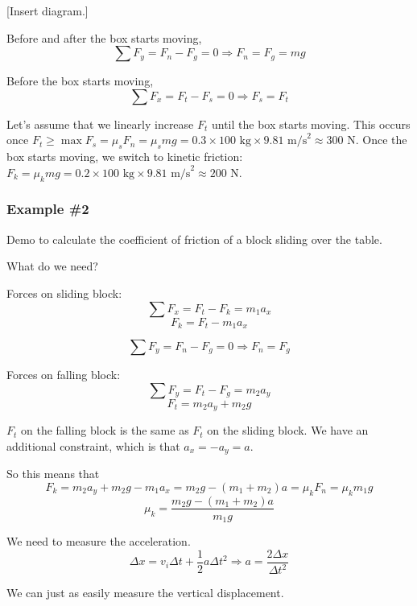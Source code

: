 [Insert diagram.]
\vspace{5cm}

Before and after the box starts moving,
$$\sum F_y = F_n-F_g=0\Rightarrow F_n=F_g=mg$$

Before the box starts moving,
$$\sum F_x=F_t-F_s=0\Rightarrow F_s=F_t$$

Let's assume that we linearly increase $F_t$ until the box starts moving. This occurs once $F_t\geq \max F_s=\mu_s F_n=\mu_s mg=0.3\times 100\mbox{ kg}\times 9.81\mbox{ m/s}^2\approx 300\mbox{ N}$. Once the box starts moving, we switch to kinetic friction: $F_k=\mu_k mg=0.2\times 100\mbox{ kg}\times 9.81\mbox{ m/s}^2\approx 200\mbox{ N}$.

\vspace{5cm}

\subsubsection{Example \#2}
Demo to calculate the coefficient of friction of a block sliding over the table.

What do we need?

Forces on sliding block:
$$\sum F_x=F_t-F_k=m_1a_x$$
$$F_k=F_t-m_1a_x$$

$$\sum F_y=F_n-F_g=0\Rightarrow F_n=F_g$$

Forces on falling block:
$$\sum F_y=F_t-F_g=m_2a_y$$
$$F_t=m_2a_y+m_2g$$

$F_t$ on the falling block is the same as $F_t$ on the sliding block. We have an additional constraint, which is that $a_x=-a_y=a$.

So this means that
$$F_k=m_2a_y+m_2g-m_1a_x=m_2g-(m_1+m_2)a=\mu_kF_n=\mu_km_1g$$
$$\mu_k=\frac{m_2g-(m_1+m_2)a}{m_1g}$$

We need to measure the acceleration.
$$\Delta{x}=v_i\Delta{t}+\frac{1}{2}a\Delta{t}^2\Rightarrow a=\frac{2\Delta{x}}{\Delta{t}^2}$$

We can just as easily measure the vertical displacement.



\clearpage
